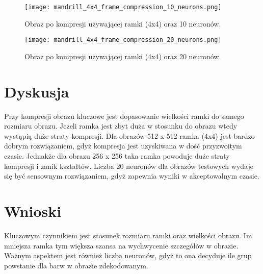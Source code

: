 \documentclass{classrep}
\begin{document}
{\begin{figure}[!htb]
	\centering
	\begin{minipage}[b]{0.4\textwidth}
		\texttt{[image: mandrill\_4x4\_frame\_compression\_10\_neurons.png]}
		\caption{Obraz po kompresji używającej ramki (4x4) oraz 10 neuronów.}
	\end{minipage}
	\hfill
	\begin{minipage}[b]{0.4\textwidth}
		\texttt{[image: mandrill\_4x4\_frame\_compression\_20\_neurons.png]}
		\caption{Obraz po kompresji używającej ramki (4x4) oraz 20 neuronów.}
	\end{minipage}
\end{figure}
	
		
}

\section{Dyskusja}
{Przy kompresji obrazu kluczowe jest dopasowanie wielkości ramki do samego rozmiaru obrazu. Jeżeli ramka jest zbyt duża w stosunku do obrazu wtedy wystąpią duże straty kompresji. Dla obrazów 512 x 512 ramka (4x4) jest bardzo dobrym rozwiązaniem, gdyż kompresja jest uzyskiwana w dość przyzwoitym czasie. Jednakże dla obrazu 256 x 256 taka ramka powoduje duże straty kompresji i zanik kształtów. Liczba 20 neuronów dla obrazów testowych wydaje się być sensownym rozwiązaniem, gdyż zapewnia wyniki w akceptowalnym czasie.}
\section{Wnioski}
{Kluczowym czynnikiem jest stosunek rozmiaru ramki oraz wielkości obrazu. Im mniejsza ramka tym większa szansa na wychwycenie szczegółów w obrazie. Ważnym aspektem jest również liczba neuronów, gdyż to ona decyduje ile grup powstanie dla barw w obrazie zdekodowanym.}
\end{document}
